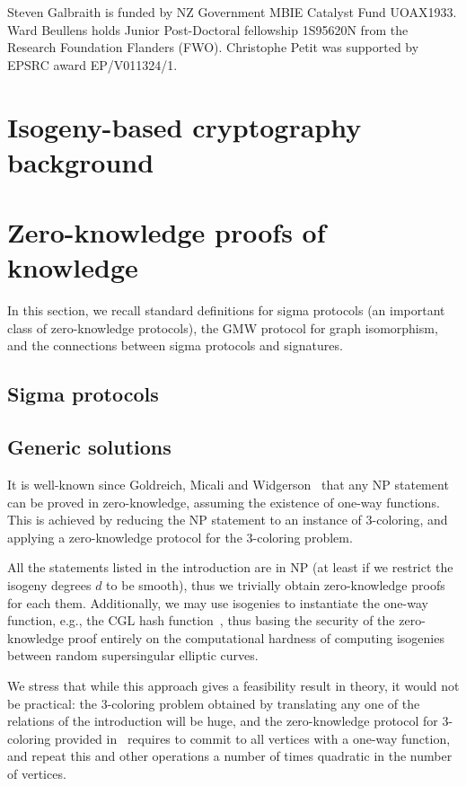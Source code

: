 \documentclass{llncs}
\begin{document}
Steven Galbraith is funded by NZ Government MBIE Catalyst Fund UOAX1933. Ward Beullens holds Junior Post-Doctoral fellowship 1S95620N from the Research Foundation Flanders (FWO).
%
Christophe Petit was supported by EPSRC award EP/V011324/1.



\section{Isogeny-based cryptography background \label{sec:IBC}}




\section{Zero-knowledge proofs of knowledge\label{sec:ZK}}

In this section, we recall standard definitions for sigma protocols (an important class of zero-knowledge protocols), the GMW protocol for graph isomorphism, and the connections between sigma protocols and signatures.

\subsection{Sigma protocols}




\subsection{Generic solutions}

It is well-known since Goldreich, Micali and Widgerson~\cite{GMW} that any NP statement can be proved in zero-knowledge, assuming the existence of one-way functions. This is achieved by reducing the NP statement to an instance of 3-coloring, and applying a zero-knowledge protocol for the 3-coloring problem.

All the statements listed in the introduction are in NP (at least if we restrict the isogeny degrees $d$ to be smooth), thus we trivially obtain zero-knowledge proofs for each them.
Additionally, we may use isogenies to instantiate the one-way function, e.g., the CGL hash function~\cite{CGL}, thus basing the security of the zero-knowledge proof entirely on the computational hardness of computing isogenies between random supersingular elliptic curves.

We stress that while this approach gives a feasibility result in theory,  it would not be practical: the 3-coloring problem obtained by translating any one of the relations of the introduction will be huge, and the zero-knowledge protocol for 3-coloring provided in~\cite{GMW} requires to commit to all vertices with a one-way function, and repeat this and other operations a number of times quadratic in the number of vertices.
\end{document}
